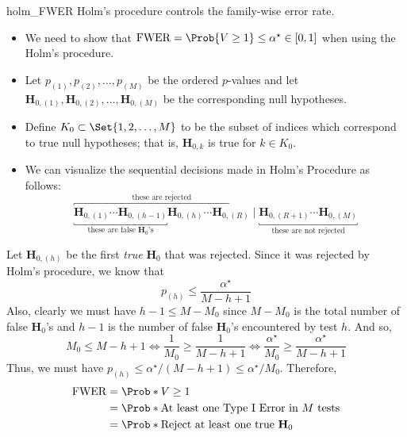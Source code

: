 \begin{Theorem}{}{holm_FWER}
    Holm's procedure controls the family-wise error rate.
\end{Theorem}
\begin{Proof}{ \dagger}{}
    \begin{itemize}
        \item We need to show that $ \FWER=\Prob{V\ge 1}\le \alpha^\star\in[0,1] $ when using the Holm's procedure.
        \item Let $ p_{(1)},p_{(2)},\ldots,p_{(M)} $ be the ordered $ p $-values and let
              $ \mathbf{H}_{0,(1)},\mathbf{H}_{0,(2)},\ldots,\mathbf{H}_{0,(M)} $ be the corresponding null hypotheses.
        \item Define $ K_0\subset \Set{1,2,\ldots,M} $ to be the subset of indices which correspond
              to true null hypotheses; that is, $ \mathbf{H}_{0,k} $ is true for $ k\in K_0 $.
        \item We can visualize the sequential decisions made in Holm's Procedure as follows:
              \[ \overbracket{\underbracket{\mathbf{H}_{0,(1)}\cdots\mathbf{H}_{0,(h-1)}}_{\text{these are false $\mathbf{H}_0$'s}}\mathbf{H}_{0,(h)}\cdots \mathbf{H}_{0,(R)}}^{\text{these are rejected}}\mid \underbracket{\mathbf{H}_{0,(R+1)}\cdots\mathbf{H}_{0,(M)}}_{\text{these are not rejected}} \]
    \end{itemize}
    Let $ \mathbf{H}_{0,(h)} $ be the first \emph{true} $ \mathbf{H}_0 $ that was rejected. Since it was rejected by Holm's procedure, we know that
    \[ p_{(h)}\le \frac{\alpha^\star}{M-h+1} \]
    Also, clearly we must have $ h-1\le M-M_0 $ since $ M-M_0 $ is the total number of false $ \mathbf{H}_0 $'s and $ h-1 $ is the number of false
    $ \mathbf{H}_0 $'s encountered by test $ h $. And so,
    \[
        M_0\le M-h+1
        \iff \frac{1}{M_0} \ge \frac{1}{M-h+1}
        \iff \frac{\alpha^\star}{M_0} \ge \frac{\alpha^\star}{M-h+1}
    \]
    Thus, we must have $ p_{(h)}\le \alpha^\star/(M-h+1)\le \alpha^\star/M_0 $. Therefore,
    \begin{align*}
        \FWER
         & =\Prob*{V\ge 1}                                                                                                                                           \\
         & =\Prob*{\text{At least one Type I Error in $M$ tests}}                                                                                                    \\
         & =\Prob*{\text{Reject at least one true $\mathbf{H}_0$}}                                                                                                   \\

\end{align*}
\end{Proof}
